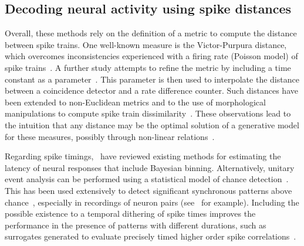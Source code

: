 \documentclass[runningheads]{llncs}
\begin{document}
\subsection{Decoding neural activity using spike distances}
%
Overall, these methods rely on the definition of a metric to compute the distance between spike trains.
One well-known measure is the Victor-Purpura distance, which overcomes inconsistencies experienced with a firing rate (Poisson model) of spike trains~\cite{victor_nature_1996}.
% 
A further study attempts to refine the metric by including a time constant as a parameter~\cite{van_rossum_novel_2001}. This parameter is then used to interpolate the distance between a coincidence detector and a rate difference counter. Such distances have been extended to non-Euclidean metrics and to the use of morphological manipulations to compute spike train dissimilarity~\cite{kreuz_measuring_2007}. These observations lead to the intuition that any distance may be the optimal solution of a generative model for these measures, possibly through non-linear relations~\cite{aronov_non-euclidean_2004}. 

Regarding spike timings,~\cite{levakova_review_2015} have reviewed existing methods for estimating the latency of neural responses that include Bayesian binning. Alternatively, unitary event analysis can be performed using a statistical model of chance detection~\cite{grun_unitary_2002-1}. This has been used extensively to detect significant synchronous patterns above chance~\cite{grun_unitary_2010}, especially in recordings of neuron pairs (see~\cite{riehle_spike_1997} for example). %
Including the possible existence to a temporal dithering of spike times improves the performance in the presence of patterns with different durations, such as surrogates generated to evaluate precisely timed higher order spike correlations~\cite{stella_comparing_2022}. %
%
\end{document}
